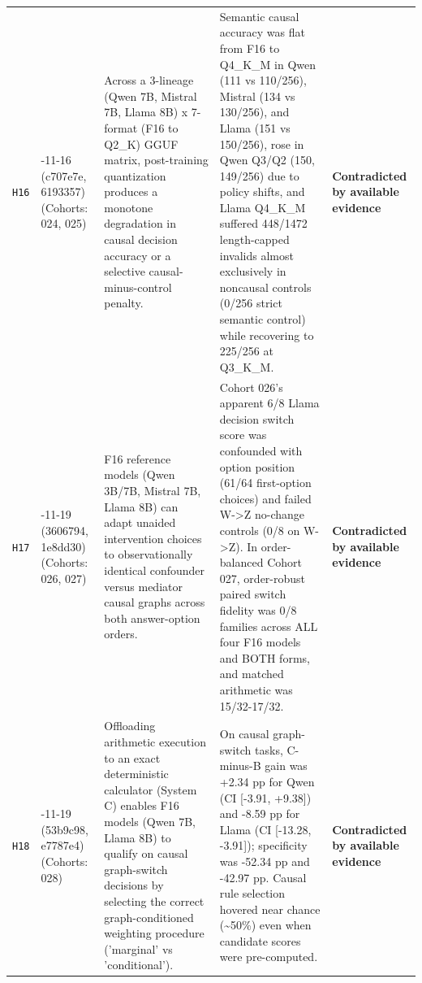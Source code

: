 {\begin{longtable}{@{}>{\raggedright\arraybackslash}p{0.9cm}>{\raggedright\arraybackslash}p{1.9cm}>{\raggedright\arraybackslash}p{4.3cm}>{\raggedright\arraybackslash}p{4.6cm}>{\raggedright\arraybackslash}p{2.7cm}@{}}
\texttt{H16} & 2026-\allowbreak{}11-\allowbreak{}16 (c707e7e, 6193357) (Cohorts: 024, 025) & Across a 3-\allowbreak{}lineage (Qwen 7B, Mistral 7B, Llama 8B) x 7-\allowbreak{}format (F16 to Q2\_K) GGUF matrix, post-\allowbreak{}training quantization produces a monotone degradation in causal decision accuracy or a selective causal-\allowbreak{}minus-\allowbreak{}control penalty. & Semantic causal accuracy was flat from F16 to Q4\_K\_M in Qwen (111 vs 110/\allowbreak{}256), Mistral (134 vs 130/\allowbreak{}256), and Llama (151 vs 150/\allowbreak{}256), rose in Qwen Q3/\allowbreak{}Q2 (150, 149/\allowbreak{}256) due to policy shifts, and Llama Q4\_K\_M suffered 448/\allowbreak{}1472 length-\allowbreak{}capped invalids almost exclusively in noncausal controls (0/\allowbreak{}256 strict semantic control) while recovering to 225/\allowbreak{}256 at Q3\_K\_M. & \textbf{Contradicted by available evidence} \\[2pt]
\texttt{H17} & 2026-\allowbreak{}11-\allowbreak{}19 (3606794, 1e8dd30) (Cohorts: 026, 027) & F16 reference models (Qwen 3B/\allowbreak{}7B, Mistral 7B, Llama 8B) can adapt unaided intervention choices to observationally identical confounder versus mediator causal graphs across both answer-\allowbreak{}option orders. & Cohort 026's apparent 6/\allowbreak{}8 Llama decision switch score was confounded with option position (61/\allowbreak{}64 first-\allowbreak{}option choices) and failed W-\allowbreak{}>Z no-\allowbreak{}change controls (0/\allowbreak{}8 on W-\allowbreak{}>Z). In order-\allowbreak{}balanced Cohort 027, order-\allowbreak{}robust paired switch fidelity was 0/\allowbreak{}8 families across ALL four F16 models and BOTH forms, and matched arithmetic was 15/\allowbreak{}32-\allowbreak{}17/\allowbreak{}32. & \textbf{Contradicted by available evidence} \\[2pt]
\texttt{H18} & 2026-\allowbreak{}11-\allowbreak{}19 (53b9c98, e7787e4) (Cohorts: 028) & Offloading arithmetic execution to an exact deterministic calculator (System C) enables F16 models (Qwen 7B, Llama 8B) to qualify on causal graph-\allowbreak{}switch decisions by selecting the correct graph-\allowbreak{}conditioned weighting procedure ('marginal' vs 'conditional'). & On causal graph-\allowbreak{}switch tasks, C-\allowbreak{}minus-\allowbreak{}B gain was +2.34 pp for Qwen (CI [-\allowbreak{}3.91, +9.38]) and -\allowbreak{}8.59 pp for Llama (CI [-\allowbreak{}13.28, -\allowbreak{}3.91]); specificity was -\allowbreak{}52.34 pp and -\allowbreak{}42.97 pp. Causal rule selection hovered near chance (\textasciitilde{}50\%) even when candidate scores were pre-\allowbreak{}computed. & \textbf{Contradicted by available evidence} \\[2pt]

\end{longtable}}
